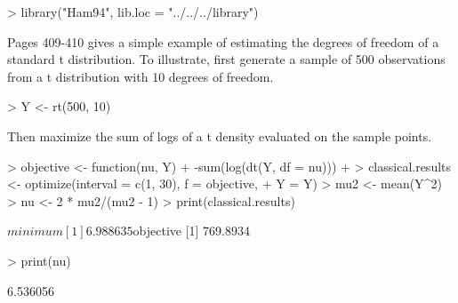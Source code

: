 \begin{Schunk}
\begin{Sinput}
> library("Ham94", lib.loc = "../../../library")
\end{Sinput}
\end{Schunk}
Pages 409-410 gives a simple example of estimating the degrees of freedom of a standard t distribution. 
To illustrate, first generate a sample of 500 observations from a t distribution with 10 degrees of freedom.
\begin{Schunk}
\begin{Sinput}
> Y <- rt(500, 10)
\end{Sinput}
\end{Schunk}
Then maximize the sum of logs of a t density evaluated on the sample points.
\begin{Schunk}
\begin{Sinput}
> objective <- function(nu, Y) {
+     -sum(log(dt(Y, df = nu)))
+ }
> classical.results <- optimize(interval = c(1, 30), f = objective, 
+     Y = Y)
> mu2 <- mean(Y^2)
> nu <- 2 * mu2/(mu2 - 1)
> print(classical.results)
\end{Sinput}
\begin{Soutput}
$minimum
[1] 6.988635

$objective
[1] 769.8934
\end{Soutput}
\begin{Sinput}
> print(nu)
\end{Sinput}
\begin{Soutput}
[1] 6.536056
\end{Soutput}
\end{Schunk}
